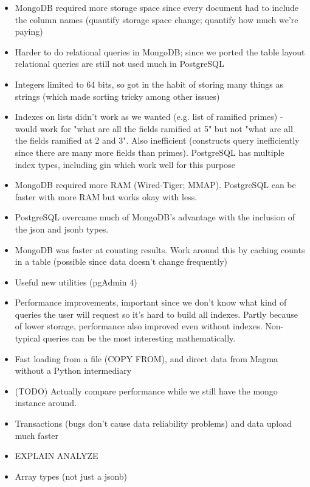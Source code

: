 \documentclass{article}
\begin{document}
\begin{itemize}
\item MongoDB required more storage space since every document had to include the column names (quantify storage space change; quantify how much we're paying)
\item Harder to do relational queries in MongoDB; since we ported the table layout relational queries are still not used much in PostgreSQL
\item Integers limited to 64 bits, so got in the habit of storing many things as strings (which made sorting tricky among other issues)
\item Indexes on lists didn't work as we wanted (e.g. list of ramified primes) - would work for "what are all the fields ramified at 5" but not "what are all the fields ramified at 2 and 3".  Also inefficient (constructs query inefficiently since there are many more fields than primes).  PostgreSQL has multiple index types, including gin which work well for this purpose
\item MongoDB required more RAM (Wired-Tiger; MMAP). PostgreSQL can be faster with more RAM but works okay with less.
\item PostgreSQL overcame much of MongoDB's advantage with the inclusion of the json and jsonb types.
\item MongoDB was faster at counting results.  Work around this by caching counts in a table (possible since data doesn't change frequently)
\item Useful new utilities (pgAdmin 4)
\item Performance improvements, important since we don't know what kind of queries the user will request so it's hard to build all indexes.  Partly because of lower storage, performance also improved even without indexes.  Non-typical queries can be the most interesting mathematically.
\item Fast loading from a file (COPY FROM), and direct data from Magma without a Python intermediary
\item (TODO) Actually compare performance while we still have the mongo instance around.
\item Transactions (bugs don't cause data reliability problems) and data upload much faster
\item EXPLAIN ANALYZE
\item Array types (not just a jsonb)
\end{itemize}
\end{document}
